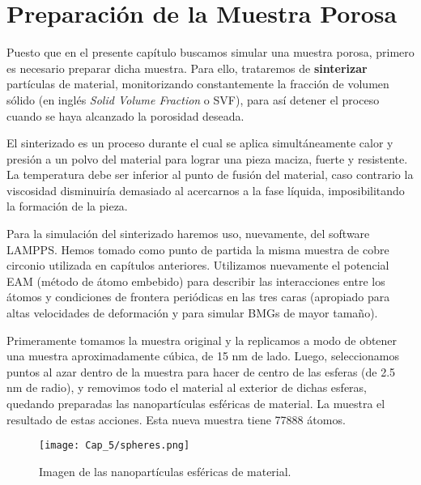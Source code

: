 
\section{Preparación de la Muestra Porosa}
\label{S5_3}

Puesto que en el presente capítulo buscamos simular una muestra porosa, primero es necesario preparar dicha muestra. Para ello,
trataremos de \textbf{sinterizar} partículas de material, monitorizando constantemente la fracción de volumen sólido (en inglés \textit{Solid Volume Fraction} o SVF), para así detener el proceso cuando se haya alcanzado la porosidad deseada.

El sinterizado es un proceso durante el cual se aplica simultáneamente calor y presión a un polvo
del material para lograr una pieza maciza, fuerte y resistente. La temperatura debe ser inferior al punto de fusión del material,
caso contrario la viscosidad disminuiría demasiado al acercarnos a la fase líquida, imposibilitando la formación de la pieza.

Para la simulación del sinterizado haremos uso, nuevamente, del software LAMPPS. Hemos tomado como punto de partida la misma muestra
de cobre circonio utilizada en capítulos anteriores. Utilizamos nuevamente el potencial EAM (método de átomo embebido) \citep{daw84}
para describir las interacciones entre los átomos y condiciones de frontera periódicas en las tres caras (apropiado para altas velocidades
de deformación \citep{bringa05} y para simular BMGs de mayor tamaño).

Primeramente tomamos la muestra original y la replicamos a modo de obtener una muestra aproximadamente cúbica, de 15 nm de lado. 
Luego, seleccionamos puntos
al azar dentro de la muestra para hacer de centro de las esferas (de 2.5 nm de radio), y removimos todo el material al exterior de dichas esferas,
quedando preparadas las nanopartículas esféricas de material. La  muestra el resultado de estas
acciones. Esta nueva muestra tiene 77888 átomos.

\begin{figure}[h!]
  \centering
  \texttt{[image: Cap\_5/spheres.png]}
  \caption[Nanopartículas esféricas de material para el sinterizado]{Imagen de las nanopartículas esféricas de material.}
  \label{C5:fg:sintInicial}
\end{figure}


